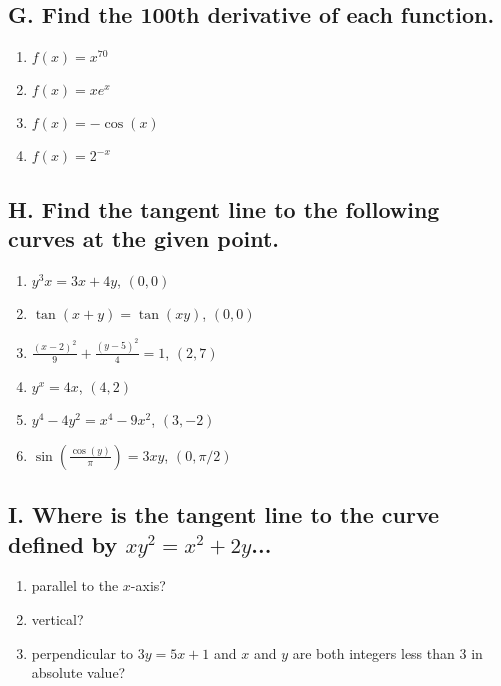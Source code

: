 \documentclass{article}
\begin{document}
\subsection*{G. Find the 100th derivative of each function.}
\begin{multicols}{4}
\begin{enumerate}
\item $f(x)=x^{70}$
\item $f(x)=xe^{x}$
\item $f(x)=-\cos(x)$
\item $f(x)=2^{-x}$
\end{enumerate}
\end{multicols}


\subsection*{H. Find the tangent line to the following curves at the given point.}

\begin{multicols}{3}
\begin{enumerate}
\item $y^{3}x=3x+4y$, $(0,0)$
\item $\tan\left(x+y\right)=\tan\left(xy\right)$, $(0,0)$
\item $\frac{\left(x-2\right)^{2}}{9}+\frac{\left(y-5\right)^{2}}{4}=1$, $(2,7)$
\item $y^{x}=4x$, $(4,2)$
\item $y^{4}-4y^{2}=x^{4}-9x^{2}$, $(3,-2)$
\item $\sin\left(\frac{\cos\left(y\right)}{\pi}\right)=3xy$, $(0,\pi/2)$
\end{enumerate}
\end{multicols}


\subsection*{I. Where is the tangent line to the curve defined by $xy^{2}=x^{2}+2y$...}

\begin{enumerate}
\item parallel to the $x$-axis?
\item vertical?
\item perpendicular to $3y=5x+1$ and $x$ and $y$ are both integers less than 3 in absolute value?
\end{enumerate}
\end{document}

